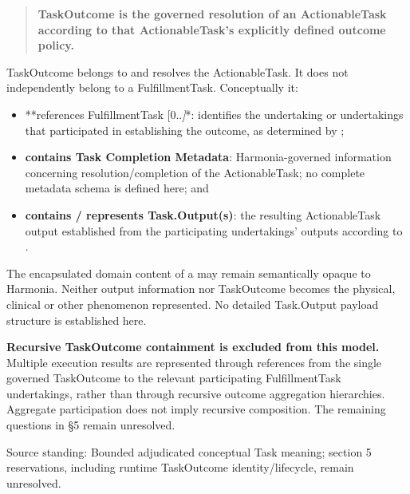 \begin{quote}


\textbf{TaskOutcome is the governed resolution of an ActionableTask according to
that ActionableTask's explicitly defined outcome policy.}



\end{quote}


TaskOutcome belongs to and resolves the ActionableTask. It does not
independently belong to a FulfillmentTask. Conceptually it:



\begin{itemize}


\item **references FulfillmentTask [0..\emph{]}*: identifies the undertaking or
  undertakings that participated in establishing the outcome, as determined
  by \texttt{};

\item \textbf{contains Task Completion Metadata}: Harmonia-governed information
  concerning resolution/completion of the ActionableTask; no complete
  metadata schema is defined here; and

\item \textbf{contains / represents Task.Output(s)}: the resulting ActionableTask
  output established from the participating undertakings' outputs according
  to \texttt{}.

\end{itemize}


The encapsulated domain content of a \texttt{} may remain semantically
opaque to Harmonia. Neither output information nor TaskOutcome becomes the
physical, clinical or other phenomenon represented. No detailed Task.Output
payload structure is established here.



\textbf{Recursive TaskOutcome containment is excluded from this model.} Multiple
execution results are represented through references from the single
governed TaskOutcome to the relevant participating FulfillmentTask
undertakings, rather than through recursive outcome aggregation hierarchies.
Aggregate participation does not imply recursive composition. The remaining
questions in §5 remain unresolved.



Source standing: Bounded adjudicated conceptual Task meaning; section 5 reservations, including runtime TaskOutcome identity/lifecycle, remain unresolved.



